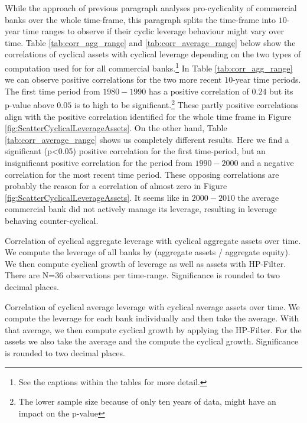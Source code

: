 \documentclass[12pt, a4paper]{article} %
\begin{document}
While the approach of previous paragraph analyses pro-cyclicality of commercial banks over the whole time-frame, this paragraph splits the time-frame into $10$-year time ranges to observe if their cyclic leverage behaviour might vary over time. Table \ref{tab:corr_agg_range} and \ref{tab:corr_average_range} below show the correlations of cyclical assets with cyclical leverage depending on the two types of computation used for for all commercial banks.\footnote{See the captions within the tables for more detail.} 
In Table \ref{tab:corr_agg_range} we can observe positive correlations for the two more recent $10$-year time periods. The first time period from $1980-1990$ has a positive correlation of $0.24$ but its p-value above $0.05$ is to high to be significant.\footnote{The lower sample size because of only ten years of data, might have an impact on the p-value} These partly positive correlations align with the positive correlation identified for the whole time frame in Figure \ref{fig:ScatterCyclicalLeverageAssets}.
On the other hand, Table \ref{tab:corr_average_range} shows us completely different results. Here we find a significant (p<0.05) positive correlation for the first time-period, but an insignificant positive correlation for the period from $1990-2000$ and a negative correlation for the most recent time period. These opposing correlations are probably the reason for a correlation of almost zero in Figure \ref{fig:ScatterCyclicalLeverageAssets}. It seems like in $2000-2010$ the average commercial bank did not actively manage its leverage, resulting in leverage behaving counter-cyclical.


\begin{table}[H]
\begin{minipage}{\textwidth}

\caption[1]{Correlation of cyclical aggregate leverage with cyclical aggregate assets over time. We compute the leverage of all banks by (aggregate assets / aggregate equity). We then compute cyclical growth of leverage as well as assets with HP-Filter. There are N=$36$ observations per time-range. Significance is rounded to two decimal places.}
\label{tab:corr_agg_range}
\end{minipage}
\end{table}


\begin{table}[H]
\begin{minipage}{\textwidth}

\caption[1]{Correlation of cyclical average leverage with cyclical average assets over time. We compute the leverage for each bank individually and then take the average. With that average, we then compute cyclical growth by applying the HP-Filter. For the assets we also take the average and the compute the cyclical growth. Significance is rounded to two decimal places.}
\label{tab:corr_average_range}
\end{minipage}
\end{table}
\end{document}
